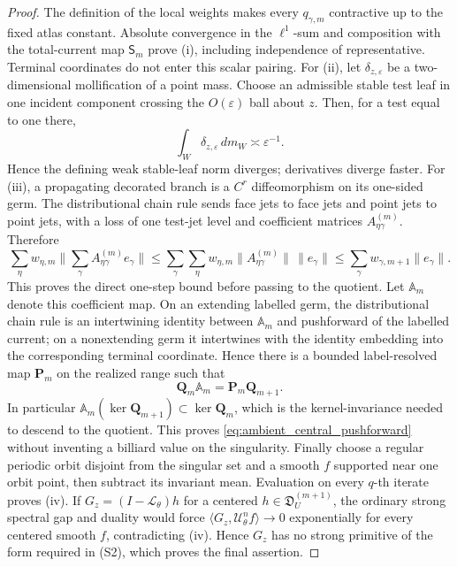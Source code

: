 \documentclass[11pt]{amsart}
\theoremstyle{compactplain}
\theoremstyle{compactdefinition}
\theoremstyle{compactremark}
\newcommand{\Ltransfer}{\mathscr L}
\begin{document}
\begin{proof}
The definition of the local weights makes every \(q_{\gamma,m}\) contractive
up to the fixed atlas constant.  Absolute convergence in the \(\ell^1\)-sum
and composition with the total-current map \(\mathsf S_m\) prove (i),
including independence of representative.  Terminal coordinates do not enter
this scalar pairing.  For (ii), let
\(\delta_{z,\varepsilon}\) be a two-dimensional mollification of a point mass.
Choose an admissible stable test leaf in one incident component crossing the
\(O(\varepsilon)\) ball about \(z\).  Then, for a test equal to one there,
\[
 \int_W\delta_{z,\varepsilon}\,dm_W\asymp\varepsilon^{-1}.
\]
Hence the defining weak stable-leaf norm diverges; derivatives diverge faster.
For (iii), a propagating decorated branch is a \(C^r\) diffeomorphism on its
one-sided germ.  The distributional chain rule sends face jets to face jets and
point jets to point jets, with a loss of one test-jet level and coefficient
matrices \(A_{\eta\gamma}^{(m)}\).  Therefore
\[
 \sum_\eta w_{\eta,m}
 \Big\|\sum_\gamma A_{\eta\gamma}^{(m)}e_\gamma\Big\|
 \le
 \sum_\gamma\sum_\eta
 w_{\eta,m}\|A_{\eta\gamma}^{(m)}\|\,\|e_\gamma\|
 \le\sum_\gamma w_{\gamma,m+1}\|e_\gamma\|.
\]
This proves the direct one-step bound before passing to the quotient.
Let \(\mathbb A_m\) denote this coefficient map.  On an extending labelled
germ, the distributional chain rule is an intertwining identity between
\(\mathbb A_m\) and pushforward of the labelled current; on a nonextending
germ it intertwines with the identity embedding into the corresponding
terminal coordinate.  Hence there is a bounded label-resolved map
\(\mathbf P_m\) on the realized range such that
\[
 \mathbf Q_m\mathbb A_m=\mathbf P_m\mathbf Q_{m+1}.
\]
In particular
\(\mathbb A_m(\ker\mathbf Q_{m+1})\subset\ker\mathbf Q_m\), which is the
kernel-invariance needed to descend to the quotient.  This proves
\eqref{eq:ambient_central_pushforward} without inventing a billiard value on
the singularity.  Finally choose a regular periodic orbit disjoint from
the singular set and a smooth \(f\) supported near one orbit point, then subtract
its invariant mean.  Evaluation on every \(q\)-th iterate proves (iv).
If \(G_z=(I-\Ltransfer_\theta)h\) for a centered
\(h\in\mathfrak D_U^{(m+1)}\), the ordinary strong spectral gap and duality
would force
\(\langle G_z,\mathscr U_\theta^nf\rangle\to0\) exponentially for every
centered smooth \(f\), contradicting (iv).  Hence \(G_z\) has no strong
primitive of the form required in (S2), which proves the final assertion.
\end{proof}
\end{document}
